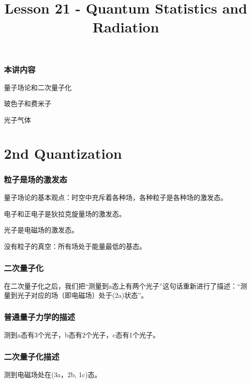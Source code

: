 \documentclass[CJK,14pt]{beamer}
\title{Lesson 21 - Quantum Statistics and Radiation}
\author{}
\date{}
\begin{document}
  \bch
{}

\begin{frame}
\frametitle{本讲内容}
\bitem
\item{量子场论和二次量子化}
\item{玻色子和费米子}
\item{光子气体}

\eitem
\end{frame}


\section{2nd Quantization}

\begin{frame}
  \frametitle{粒子是场的激发态}
  量子场论的基本观点：时空中充斥着各种场，各种粒子是各种场的激发态。

  \skiplines
  
  \bex
  
    电子和正电子是狄拉克旋量场的激发态。
    
    光子是电磁场的激发态。

    没有粒子的真空：所有场处于能量最低的基态。    
  \eex
  

\end{frame}


\begin{frame}
\frametitle{二次量子化}

在二次量子化之后，我们把“测量到a态上有两个光子”这句话重新进行了描述：“测量到光子对应的场（即电磁场）处于(2a)状态”。

\skipline


\end{frame}


\begin{frame}
\frametitle{普通量子力学的描述}


测到a态有3个光子，b态有2个光子，c态有1个光子。

\end{frame}


\begin{frame}
\frametitle{二次量子化描述}

\emini
{}
测到电磁场处在(3a，2b, 1c)态。


\emini


\end{frame}
\end{document}
